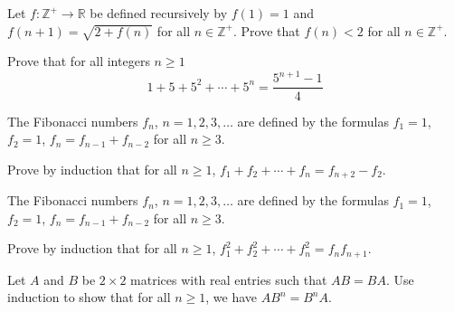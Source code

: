 
\newcommand{\R}{\mathbb{R}}
\newcommand{\Z}{\mathbb{Z}}
	

Let $f\colon \Z^+\to\R$ be defined recursively by $f(1)=1$ and $f(n+1)=\sqrt{2+f(n)}$ for all $n\in\Z^+$. Prove that $f(n)<2$ for all $n\in\Z^+$.
	

Prove that for all integers $n\geq 1$
		\[1+5+5^2+\cdots + 5^n=\frac{5^{n+1}-1}{4}\]
	

The Fibonacci numbers $f_n$, $n=1,2,3,\dots$ are defined by the formulas $f_1=1$, $f_2=1$, $f_n=f_{n-1}+f_{n-2}$ for all $n\geq 3$. 
	
Prove by induction that for all $n\geq 1$, $f_1+f_2+\cdots+f_n = f_{n+2}-f_2$.
	

The Fibonacci numbers $f_n$, $n=1,2,3,\dots$ are defined by the formulas $f_1=1$, $f_2=1$, $f_n=f_{n-1}+f_{n-2}$ for all $n\geq 3$. 
	
Prove by induction that for all $n\geq 1$, $f_1^2+f_2^2+\cdots+f_n^2 = f_{n}f_{n+1}$.
	

Let $A$ and $B$ be $2\times 2$ matrices with real entries such that $AB=BA$. Use induction to show that for all $n\geq 1$, we have $AB^n = B^nA$.
	